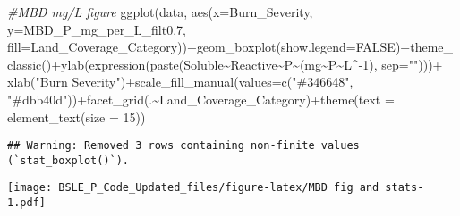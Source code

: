 \documentclass[
]{article}
\newenvironment{Shaded}{\begin{snugshade}}{\end{snugshade}}
\newcommand{\AttributeTok}[1]{\textcolor[rgb]{0.77,0.63,0.00}{#1}}
\newcommand{\CommentTok}[1]{\textcolor[rgb]{0.56,0.35,0.01}{\textit{#1}}}
\newcommand{\ConstantTok}[1]{\textcolor[rgb]{0.00,0.00,0.00}{#1}}
\newcommand{\DecValTok}[1]{\textcolor[rgb]{0.00,0.00,0.81}{#1}}
\newcommand{\FloatTok}[1]{\textcolor[rgb]{0.00,0.00,0.81}{#1}}
\newcommand{\FunctionTok}[1]{\textcolor[rgb]{0.00,0.00,0.00}{#1}}
\newcommand{\NormalTok}[1]{#1}
\newcommand{\SpecialCharTok}[1]{\textcolor[rgb]{0.00,0.00,0.00}{#1}}
\newcommand{\StringTok}[1]{\textcolor[rgb]{0.31,0.60,0.02}{#1}}
\begin{document}
\begin{Shaded}
\begin{Highlighting}[]
\CommentTok{\#MBD mg/L figure}
\FunctionTok{ggplot}\NormalTok{(data, }\FunctionTok{aes}\NormalTok{(}\AttributeTok{x=}\NormalTok{Burn\_Severity, }\AttributeTok{y=}\NormalTok{MBD\_P\_mg\_per\_L\_filt0}\FloatTok{.7}\NormalTok{, }\AttributeTok{fill=}\NormalTok{Land\_Coverage\_Category))}\SpecialCharTok{+}\FunctionTok{geom\_boxplot}\NormalTok{(}\AttributeTok{show.legend=}\ConstantTok{FALSE}\NormalTok{)}\SpecialCharTok{+}\FunctionTok{theme\_classic}\NormalTok{()}\SpecialCharTok{+}\FunctionTok{ylab}\NormalTok{(}\FunctionTok{expression}\NormalTok{(}\FunctionTok{paste}\NormalTok{(Soluble}\SpecialCharTok{\textasciitilde{}}\NormalTok{Reactive}\SpecialCharTok{\textasciitilde{}}\NormalTok{P}\SpecialCharTok{\textasciitilde{}}\NormalTok{(mg}\SpecialCharTok{\textasciitilde{}}\NormalTok{P}\SpecialCharTok{\textasciitilde{}}\NormalTok{L}\SpecialCharTok{\^{}{-}}\DecValTok{1}\NormalTok{), }\AttributeTok{sep=}\StringTok{""}\NormalTok{)))}\SpecialCharTok{+} \FunctionTok{xlab}\NormalTok{(}\StringTok{"Burn Severity"}\NormalTok{)}\SpecialCharTok{+}\FunctionTok{scale\_fill\_manual}\NormalTok{(}\AttributeTok{values=}\FunctionTok{c}\NormalTok{(}\StringTok{"\#346648"}\NormalTok{, }\StringTok{"\#dbb40d"}\NormalTok{))}\SpecialCharTok{+}\FunctionTok{facet\_grid}\NormalTok{(.}\SpecialCharTok{\textasciitilde{}}\NormalTok{Land\_Coverage\_Category)}\SpecialCharTok{+}\FunctionTok{theme}\NormalTok{(}\AttributeTok{text =} \FunctionTok{element\_text}\NormalTok{(}\AttributeTok{size =} \DecValTok{15}\NormalTok{))}
\end{Highlighting}
\end{Shaded}

\begin{verbatim}
## Warning: Removed 3 rows containing non-finite values (`stat_boxplot()`).
\end{verbatim}

\texttt{[image: BSLE\_P\_Code\_Updated\_files/figure-latex/MBD fig and stats-1.pdf]}
\end{document}
